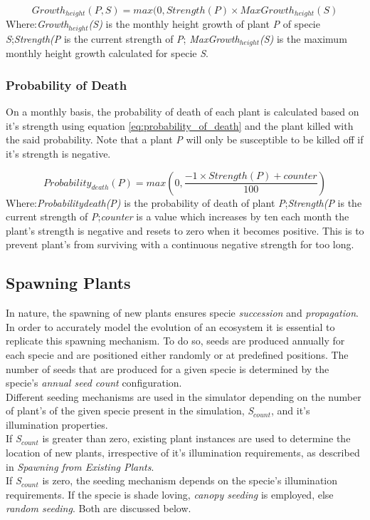 \begin{equation}
Growth_{height}(\textit{P},S) = max(0, Strength(\textit{P}) \times  MaxGrowth_{height}(S)
\label{eq:actual_height_growth}
\end{equation}
Where:\textit{Growth$_{height}$(S)} is the monthly height growth of plant \textit{P} of specie \textit{S};\textit{Strength(\textit{P}} is the current strength of \textit{P}; \textit{MaxGrowth$_{height}$(S)} is the maximum monthly height growth calculated for specie \textit{S}.

\subsubsection{Probability of Death}

On a monthly basis, the probability of death of each plant is calculated based on it's strength using equation \ref{eq:probability_of_death} and the plant killed with the said probability. Note that a plant \textit{P} will only be susceptible to be killed off if it's strength is negative. 

\begin{equation}
Probability_{death}(P) = max(0, \frac{-1 \times Strength(P) + counter}{100})
\label{eq:probability_of_death}
\end{equation}
Where:\textit{Probability{death}(P)} is the probability of death of plant \textit{P};\textit{Strength(\textit{P}} is the current strength of \textit{P};\textit{counter} is a value which increases by ten each month the plant's strength is negative and resets to zero when it becomes positive. This is to prevent plant's from surviving with a continuous negative strength for too long.

\subsection{Spawning Plants}

In nature, the spawning of new plants ensures specie \textit{succession} and \textit{propagation}. In order to accurately model the evolution of an ecosystem it is essential to replicate this spawning mechanism. To do so, seeds are produced annually for each specie and are positioned either randomly or at predefined positions. The number of seeds that are produced for a given specie is determined by the specie's \textit{annual seed count} configuration.\\

Different seeding mechanisms are used in the simulator depending on the number of plant's of the given specie present in the simulation, \textit{S$_{count}$}, and it's illumination properties.\\
If \textit{S$_{count}$} is greater than zero, existing plant instances are used to determine the location of new plants, irrespective of it's illumination requirements, as described in \textit{Spawning from Existing Plants}.\\
If \textit{S$_{count}$} is zero, the seeding mechanism depends on the specie's illumination requirements. If the specie is shade loving, \textit{canopy seeding} is employed, else \textit{random seeding}. Both are discussed below.

